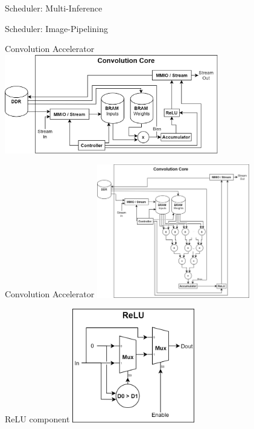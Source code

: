 \begin{frame}{Scheduler: Multi-Inference}

\end{frame}

\begin{frame}{Scheduler: Image-Pipelining}

\end{frame}

\begin{frame}{Convolution Accelerator}
	\centering
	\includegraphics[width=0.7\textwidth]{../Images/Platform/Conv_core_serial.png}\\
\end{frame}

\begin{frame}{Convolution Accelerator}
	\centering
	\includegraphics[width=0.5\textwidth]{../Images/Platform/Conv_core_row_parallel.png}\\
\end{frame}

\begin{frame}{ReLU component}
	\centering
	\includegraphics[width=0.4\textwidth]{../Images/Platform/ReLU_component.png}\\
\end{frame}

